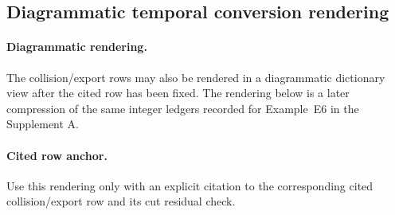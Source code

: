 \subsection{Diagrammatic temporal conversion rendering}\label{app:feynman-dict}
\paragraph{Diagrammatic rendering.} The collision/export rows may also be rendered in a diagrammatic dictionary view after the cited row has been fixed. The rendering below is a later compression of the same integer ledgers recorded for Example~E6 in the Supplement A.

\begin{center}
\end{center}

\paragraph{Cited row anchor.} Use this rendering only with an explicit citation to the corresponding cited collision/export row and its cut residual check.
